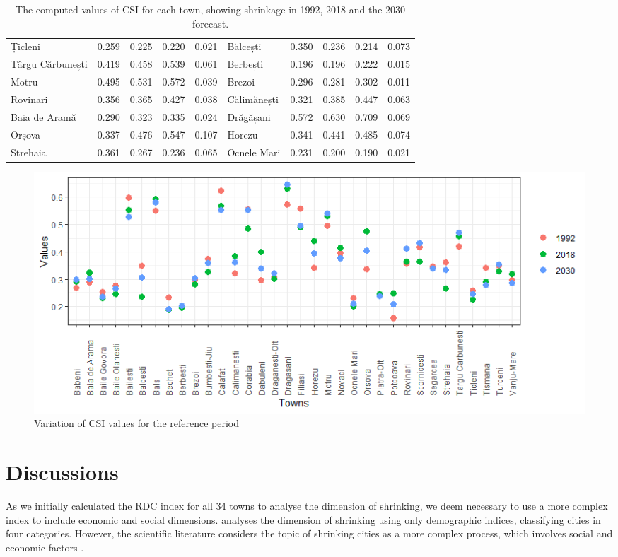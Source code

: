 \begin{table}[ht]
\begin{tabular}{ lcccc|lcccc }
		Țicleni                     & 0.259 & 0.225 & 0.220 & 0.021   & Bălcești                    & 0.350 & 0.236 & 0.214 & 0.073   \\
		Târgu Cărbunești            & 0.419 & 0.458 & 0.539 & 0.061   & Berbești                    & 0.196 & 0.196 & 0.222 & 0.015   \\
		Motru                       & 0.495 & 0.531 & 0.572 & 0.039   & Brezoi                      & 0.296 & 0.281 & 0.302 & 0.011   \\
		Rovinari                    & 0.356 & 0.365 & 0.427 & 0.038   & Călimănești                 & 0.321 & 0.385 & 0.447 & 0.063   \\
		Baia de Aramă               & 0.290 & 0.323 & 0.335 & 0.024   & Drăgășani                   & 0.572 & 0.630 & 0.709 & 0.069   \\
		Orșova                      & 0.337 & 0.476 & 0.547 & 0.107   & Horezu                      & 0.341 & 0.441 & 0.485 & 0.074   \\
		Strehaia                    & 0.361 & 0.267 & 0.236 & 0.065   & Ocnele Mari                 & 0.231 & 0.200 & 0.190 & 0.021   \\
		\bottomrule
	\end{tabular}
	\caption{The computed values of CSI for each town, showing shrinkage in 1992, 2018 and the 2030 forecast.}
	\label{table:6}
\end{table}

\begin{figure}[htbp]
	\centering
	\includegraphics[width=1\textwidth]{scatterplot}
	\caption{Variation of CSI values for the reference period}
	\label{figure:scatterplot}
\end{figure}

\section{Discussions}

As we initially calculated the RDC index for all 34 towns to analyse the dimension of shrinking, we deem necessary to use a more complex index to include economic and social dimensions. \citet{tivig_mapping_2008} analyses the dimension of shrinking using only demographic indices, classifying cities in four categories. However, the scientific literature considers the topic of shrinking cities as a more complex process, which involves social and economic factors \citep{bernt_policy_2012, martinez-fernandez_shrinking_2015, wolff_indicators_2014}.


